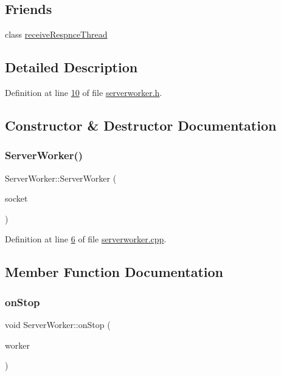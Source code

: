 \subsection*{Friends}
\begin{DoxyCompactItemize}
\item 
class \hyperlink{a00185_a767ca3da04cac0be47d1ee1da9eea938}{receive\+Respnce\+Thread}
\end{DoxyCompactItemize}


\subsection{Detailed Description}


Definition at line \hyperlink{a00110_source_l00010}{10} of file \hyperlink{a00110_source}{serverworker.\+h}.



\subsection{Constructor \& Destructor Documentation}
\mbox{\label{a00185_aa8aee43d415cf337417a1d1f180ef03a}} 
\subsubsection{\texorpdfstring{Server\+Worker()}{ServerWorker()}}
{\footnotesize\ttfamily Server\+Worker\+::\+Server\+Worker (\begin{DoxyParamCaption}\item[{Q\+Tcp\+Socket $\ast$}]{socket }\end{DoxyParamCaption})}



Definition at line \hyperlink{a00107_source_l00006}{6} of file \hyperlink{a00107_source}{serverworker.\+cpp}.



\subsection{Member Function Documentation}
\mbox{\label{a00185_ab80ef665f93d81c71a83aa42f8d888df}} 
\subsubsection{\texorpdfstring{on\+Stop}{onStop}}
{\footnotesize\ttfamily void Server\+Worker\+::on\+Stop (\begin{DoxyParamCaption}\item[{\hyperlink{a00185}{Server\+Worker} $\ast$}]{worker }\end{DoxyParamCaption})\hspace{0.3cm}{\ttfamily [signal]}}

